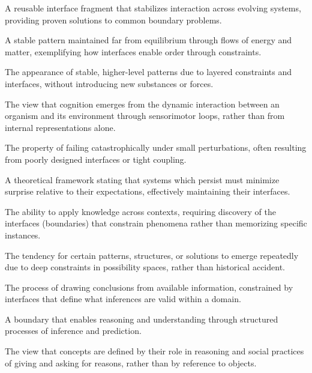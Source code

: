 \documentclass[
  openright]{book}
\renewenvironment{description}
  {\list{}{\labelwidth 0pt \itemindent-\leftmargin \leftmargin 2.5em
          \itemsep 0.4\baselineskip
          \parsep 0pt
          \let\makelabel\descriptionlabel}}
  {\endlist}
\newcommand*\descriptionlabel[1]{\hspace\labelsep\normalfont\bfseries #1}
\begin{document}
\begin{description}
\item[Design Pattern] A reusable interface fragment that stabilizes interaction across evolving systems, providing proven solutions to common boundary problems.

\item[Dissipative Structure] A stable pattern maintained far from equilibrium through flows of energy and matter, exemplifying how interfaces enable order through constraints.

\item[Emergence] The appearance of stable, higher-level patterns due to layered constraints and interfaces, without introducing new substances or forces.

\item[Enaction] The view that cognition emerges from the dynamic interaction between an organism and its environment through sensorimotor loops, rather than from internal representations alone.

\item[Fragility] The property of failing catastrophically under small perturbations, often resulting from poorly designed interfaces or tight coupling.

\item[Free Energy Principle] A theoretical framework stating that systems which persist must minimize surprise relative to their expectations, effectively maintaining their interfaces.

\item[Generalization] The ability to apply knowledge across contexts, requiring discovery of the interfaces (boundaries) that constrain phenomena rather than memorizing specific instances.

\item[Inevitability] The tendency for certain patterns, structures, or solutions to emerge repeatedly due to deep constraints in possibility spaces, rather than historical accident.

\item[Inference] The process of drawing conclusions from available information, constrained by interfaces that define what inferences are valid within a domain.

\item[Inferential Interface] A boundary that enables reasoning and understanding through structured processes of inference and prediction.

\item[Inferentialism] The view that concepts are defined by their role in reasoning and social practices of giving and asking for reasons, rather than by reference to objects.


\end{description}
\end{document}
